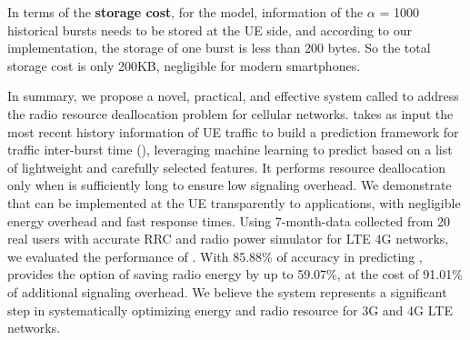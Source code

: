 In terms of the {\bf storage cost}, for the \MostRecent model, information of the $\alpha$ = 1000 historical bursts needs to be stored at the UE side, and according to our implementation, the storage of one burst is less than 200 bytes. So the total storage cost is only 200KB, negligible for modern smartphones.

\label{sec:rp.summary}

In summary, we propose a novel, practical, and effective system called \NAMEFULL to address the radio resource deallocation problem for cellular networks. \NAME takes as input the most recent history information of UE traffic to build a prediction framework for traffic inter-burst time (\IBT), leveraging machine learning to predict \IBT based on a list of lightweight and carefully selected features. It performs resource deallocation only when \IBT is sufficiently long to ensure low signaling overhead. We demonstrate that \NAME can be implemented at the UE transparently to applications, with negligible energy overhead and fast response times. Using 7-month-data collected from 20 real users with accurate RRC and radio power simulator for LTE 4G networks, we evaluated the performance of \NAME. With 85.88\% of accuracy in predicting \IBTS, \NAME provides the option of saving radio energy by up to 59.07\%, at the cost of 91.01\% of additional signaling overhead. We believe the \NAME system represents a significant step in systematically optimizing energy and radio resource for 3G and 4G LTE networks.

